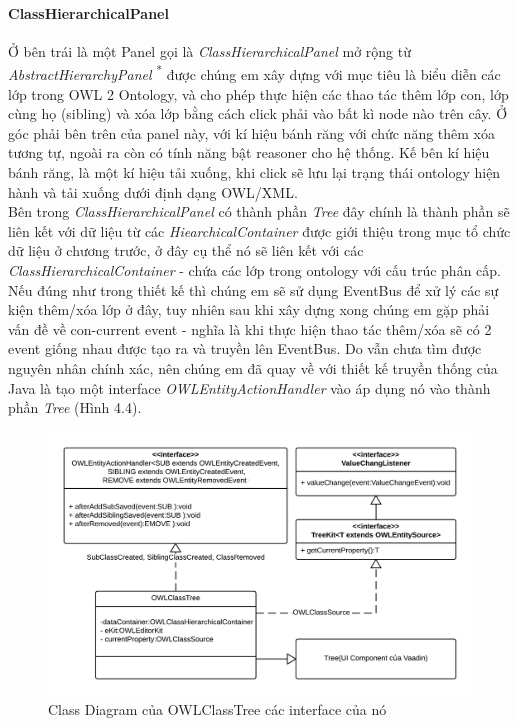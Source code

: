 \paragraph{ClassHierarchicalPanel}
Ở bên trái là một Panel gọi là \textit{ClassHierarchicalPanel} mở rộng từ \textit{AbstractHierarchyPanel} \textsuperscript{*} được chúng em xây dựng với mục tiêu là biểu diễn các lớp trong OWL 2 Ontology, và cho phép thực hiện các thao tác thêm lớp con, lớp cùng họ (sibling) và xóa lớp bằng cách click phải vào bất kì node nào trên cây. Ở góc phải bên trên của panel này, với kí hiệu bánh răng với chức năng thêm xóa tương tự, ngoài ra còn có tính năng bật reasoner cho hệ thống. Kế bên kí hiệu bánh răng, là một kí hiệu tải xuống, khi click sẽ lưu lại trạng thái ontology hiện hành và tải xuống dưới định dạng OWL/XML.
\\
Bên trong \textit{ClassHierarchicalPanel} có thành phần \textit{Tree} đây chính là thành phần sẽ liên kết với dữ liệu từ các \textit{HiearchicalContainer} được giới thiệu trong mục tổ chức dữ liệu ở chương trước, ở đây cụ thể nó sẽ liên kết với các \textit{ClassHierarchicalContainer} - chứa các lớp trong ontology với cấu trúc phân cấp. Nếu đúng như trong thiết kế thì chúng em sẽ sử dụng EventBus để xử lý các sự kiện thêm/xóa lớp ở đây, tuy nhiên sau khi xây dựng xong chúng em gặp phải vấn đề về con-current event - nghĩa là khi thực hiện thao tác thêm/xóa sẽ có 2 event giống nhau được tạo ra và truyền lên EventBus. Do vẫn chưa tìm được nguyên nhân chính xác, nên chúng em đã quay về với thiết kế truyền thống của Java là tạo một interface \textit{OWLEntityActionHandler} vào áp dụng nó vào thành phần \textit{Tree} (Hình 4.4).
\begin{figure}[h!]
	\centering
	\includegraphics[width=155mm]{Figures/uml_owlclasstree.png}
	\caption{Class Diagram của OWLClassTree các interface của nó \label{overflow}}
\end{figure}
